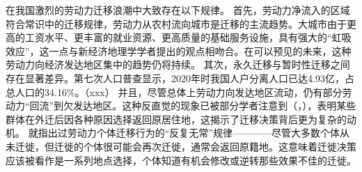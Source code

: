 \documentclass[
  a4paper,
  zihao=-4,
  fontset=mac,
  AutoFakeBold,
  AutoFakeSlant,
  oneside]{ctexbook}
\begin{document}
在我国激烈的劳动力迁移浪潮中大致存在以下规律。
首先，劳动力净流入的区域符合常识中的迁移规律，劳动力从农村流向城市是迁移的主流趋势。大城市由于更高的工资水平、更丰富的就业资源、更高质量的基础服务设施，具有强大的“虹吸效应”，这一点与新经济地理学学者提出的观点相吻合。在可以预见的未来，这种劳动力向经济发达地区集中的趋势仍将持续。
其次，永久迁移与暂时性迁移之间存在显著差异。第七次人口普查显示，2020年时我国人户分离人口已达4.93亿，占总人口的34.16\%。（xxx）
并且，尽管总体上劳动力向发达地区流动，仍有部分劳动力“回流”到欠发达地区。这种反直觉的现象已被部分学者注意到（\textcite{ShiZhiLeiJiaTingBingFuJiaTingJueCeYuNongCunQianYiLaoDongLiHuiLiu2012}，\textcite{RenYuanNongCunWaiChuLaoDongLiHuiLiuQianYiDeYingXiangYinSuHeHuiLiuXiaoYing2017}），表明某些群体在外迁后因各种原因选择返回原居住地，这揭示了迁移决策背后更为复杂的动机。
\textcite{davanzoRepeatMigrationUnited1983}就指出过劳动力个体迁移行为的“反复无常”规律————尽管大多数个体从未迁徙，但迁徙的个体很可能会再次迁徙，通常会返回原籍地。这意味着迁徙决策应该被看作是一系列地点选择，个体知道有机会修改或逆转那些效果不佳的迁徙。
\end{document}
